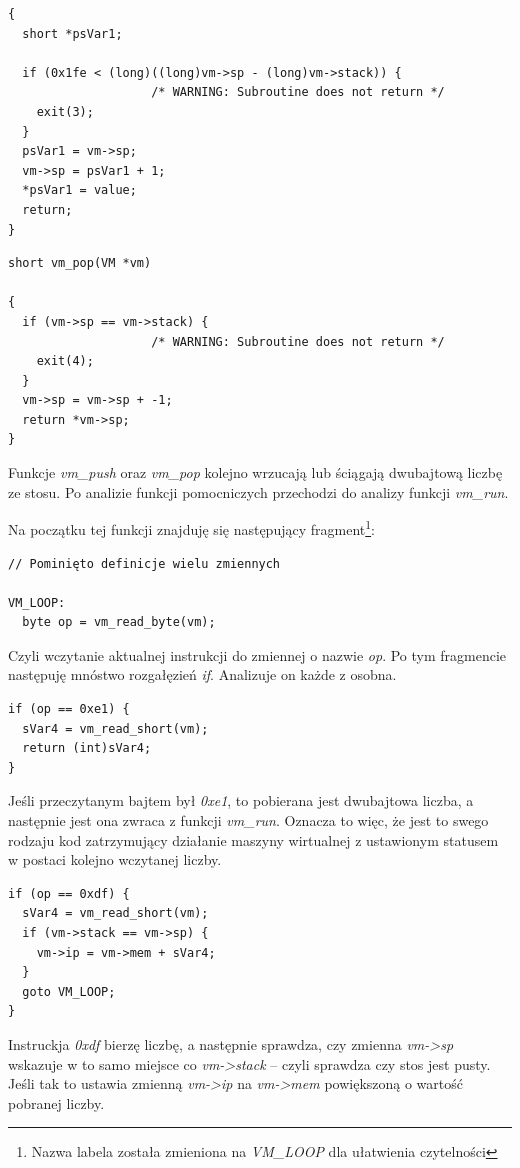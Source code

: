 \documentclass[language=polish,type=eng]{aghmodern}
\begin{document}
\begin{appendices}
\begin{verbatim}
{
  short *psVar1;
  
  if (0x1fe < (long)((long)vm->sp - (long)vm->stack)) {
                    /* WARNING: Subroutine does not return */
    exit(3);
  }
  psVar1 = vm->sp;
  vm->sp = psVar1 + 1;
  *psVar1 = value;
  return;
}
\end{verbatim}

\begin{verbatim}
short vm_pop(VM *vm)

{
  if (vm->sp == vm->stack) {
                    /* WARNING: Subroutine does not return */
    exit(4);
  }
  vm->sp = vm->sp + -1;
  return *vm->sp;
}
\end{verbatim}

Funkcje \emph{vm\_push} oraz \emph{vm\_pop} kolejno wrzucają lub ściągają dwubajtową
liczbę ze stosu. Po analizie funkcji pomocniczych przechodzi do analizy funkcji
\emph{vm\_run}.

Na początku tej funkcji znajduję się następujący fragment\footnote{Nazwa labela została
zmieniona na \emph{VM\_LOOP} dla ułatwienia czytelności}:

\begin{verbatim}
// Pominięto definicje wielu zmiennych

VM_LOOP:
  byte op = vm_read_byte(vm);
\end{verbatim}

Czyli wczytanie aktualnej instrukcji do zmiennej o nazwie \emph{op}. Po tym fragmencie
następuję mnóstwo rozgałęzień \emph{if}. Analizuje on każde z osobna.

\begin{verbatim}
if (op == 0xe1) {
  sVar4 = vm_read_short(vm);
  return (int)sVar4;
}
\end{verbatim}

Jeśli przeczytanym bajtem był \emph{0xe1}, to pobierana jest dwubajtowa liczba, a następnie
jest ona zwraca z funkcji \emph{vm\_run}. Oznacza to więc, że jest to swego rodzaju kod
zatrzymujący działanie maszyny wirtualnej z ustawionym statusem w postaci kolejno
wczytanej liczby.

\begin{verbatim}
if (op == 0xdf) {
  sVar4 = vm_read_short(vm);
  if (vm->stack == vm->sp) {
    vm->ip = vm->mem + sVar4;
  }
  goto VM_LOOP;
}
\end{verbatim}

Instruckja \emph{0xdf} bierzę liczbę, a następnie sprawdza, czy zmienna \emph{vm->sp} wskazuje
w to samo miejsce co \emph{vm->stack} -- czyli sprawdza czy stos jest pusty. Jeśli tak
to ustawia zmienną \emph{vm->ip} na \emph{vm->mem} powiększoną o wartość pobranej liczby.


\end{appendices}
\end{document}
